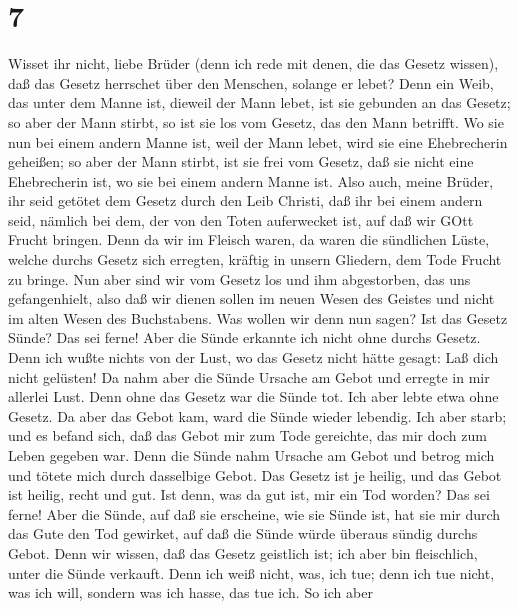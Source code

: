 \hypertarget{section-6}{%
\section{7}\label{section-6}}

 Wisset ihr nicht, liebe Brüder (denn ich rede mit denen,
die das Gesetz wissen), daß das Gesetz herrschet über den Menschen,
solange er lebet?  Denn ein Weib, das unter dem Manne ist,
dieweil der Mann lebet, ist sie gebunden an das Gesetz; so aber der Mann
stirbt, so ist sie los vom Gesetz, das den Mann betrifft. 
Wo sie nun bei einem andern Manne ist, weil der Mann lebet, wird sie
eine Ehebrecherin geheißen; so aber der Mann stirbt, ist sie frei vom
Gesetz, daß sie nicht eine Ehebrecherin ist, wo sie bei einem andern
Manne ist.  Also auch, meine Brüder, ihr seid getötet dem
Gesetz durch den Leib Christi, daß ihr bei einem andern seid, nämlich
bei dem, der von den Toten auferwecket ist, auf daß wir GOtt Frucht
bringen.  Denn da wir im Fleisch waren, da waren die
sündlichen Lüste, welche durchs Gesetz sich erregten, kräftig in unsern
Gliedern, dem Tode Frucht zu bringe.  Nun aber sind wir vom
Gesetz los und ihm abgestorben, das uns gefangenhielt, also daß wir
dienen sollen im neuen Wesen des Geistes und nicht im alten Wesen des
Buchstabens.  Was wollen wir denn nun sagen? Ist das Gesetz
Sünde? Das sei ferne! Aber die Sünde erkannte ich nicht ohne durchs
Gesetz. Denn ich wußte nichts von der Lust, wo das Gesetz nicht hätte
gesagt: Laß dich nicht gelüsten!  Da nahm aber die Sünde
Ursache am Gebot und erregte in mir allerlei Lust. Denn ohne das Gesetz
war die Sünde tot.  Ich aber lebte etwa ohne Gesetz. Da aber
das Gebot kam, ward die Sünde wieder lebendig.  Ich aber
starb; und es befand sich, daß das Gebot mir zum Tode gereichte, das mir
doch zum Leben gegeben war.  Denn die Sünde nahm Ursache am
Gebot und betrog mich und tötete mich durch dasselbige Gebot.
 Das Gesetz ist je heilig, und das Gebot ist heilig, recht
und gut.  Ist denn, was da gut ist, mir ein Tod worden? Das
sei ferne! Aber die Sünde, auf daß sie erscheine, wie sie Sünde ist, hat
sie mir durch das Gute den Tod gewirket, auf daß die Sünde würde überaus
sündig durchs Gebot.  Denn wir wissen, daß das Gesetz
geistlich ist; ich aber bin fleischlich, unter die Sünde verkauft.
 Denn ich weiß nicht, was, ich tue; denn ich tue nicht, was
ich will, sondern was ich hasse, das tue ich.  So ich aber
